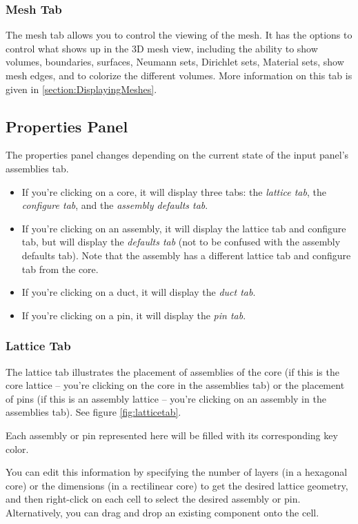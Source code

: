 \subsubsection{Mesh Tab}
The mesh tab allows you to control the viewing of the mesh.  It has the options to control what shows up in the 3D mesh view, including the ability to show volumes, boundaries, surfaces, Neumann sets, Dirichlet sets, Material sets, show mesh edges, and to colorize the different volumes.  More information on this tab is given in \ref{section:DisplayingMeshes}.

\subsection{Properties Panel}
The properties panel changes depending on the current state of the input panel's assemblies tab.

\begin{itemize}
	\item{If you're clicking on a core, it will display three tabs: the \emph{lattice tab}, the \emph{configure tab}, and the \emph{assembly defaults tab}.}
	\item{If you're clicking on an assembly, it will display the lattice tab and configure tab, but will display the \emph{defaults tab} (not to be confused with the assembly defaults tab).  Note that the assembly has a different lattice tab and configure tab from the core.}
	\item{If you're clicking on a duct, it will display the \emph{duct tab}.}
	\item{If you're clicking on a pin, it will display the \emph{pin tab}.}
\end{itemize}

\subsubsection{Lattice Tab}
The lattice tab illustrates the placement of assemblies of the core (if this is the core lattice -- you're clicking on the core in the assemblies tab) or the placement of pins (if this is an assembly lattice -- you're clicking on an assembly in the assemblies tab).  See figure \ref{fig:latticetab}.

Each assembly or pin represented here will be filled with its corresponding key color.

You can edit this information by specifying the number of layers (in a hexagonal core) or the dimensions (in a rectilinear core) to get the desired lattice geometry, and then right-click on each cell to select the desired assembly or pin.  Alternatively, you can drag and drop an existing component onto the cell.

